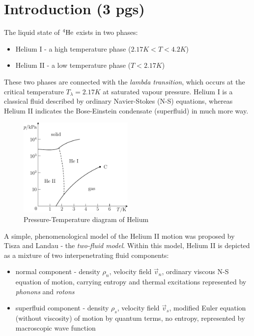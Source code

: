 \chapter*{Introduction (3 pgs)}

	The liquid state of ${}^4\mathrm{He}$ exists in two phases:
	\begin{itemize}
		\item Helium I - a high temperature phase ($2.17\unit{K}<T<4.2\unit{K}$)
		\item Helium II - a low temperature phase ($T<2.17\unit{K}$)
	\end{itemize}

	These two phases are connected with the \textit{lambda transition}, which occurs at the critical temperature $T_{\lambda} = 2.17 \unit{K}$ at saturated vapour pressure. Helium I is a classical fluid described by ordinary Navier-Stokes (N-S) equations, whereas Helium II indicates the Bose-Einstein condensate (superfluid) in much more way.

	\begin{figure}[h]
		\centering
		\includegraphics[width=0.5\textwidth]{graphics/theory/phase_diag}
		\caption{Pressure-Temperature diagram of Helium}
		\label{phase}
	\end{figure}

	A simple, phenomenological model of the Helium II motion was proposed by Tisza and Landau - the \textit{two-fluid model}. Within this model, Helium II is depicted as a mixture of two interpenetrating fluid components:

	\begin{itemize}
		\item normal component - density $\rho_n$, velocity field $\vec{v}_n$, ordinary viscous N-S equation of motion, carrying entropy and thermal excitations represented by \textit{phonons} and \textit{rotons}
		\item superfluid component - density $\rho_s$, velocity field $\vec{v}_s$, modified Euler equation (without viscosity) of motion by quantum terms, no entropy, represented by macroscopic wave function
	\end{itemize}

